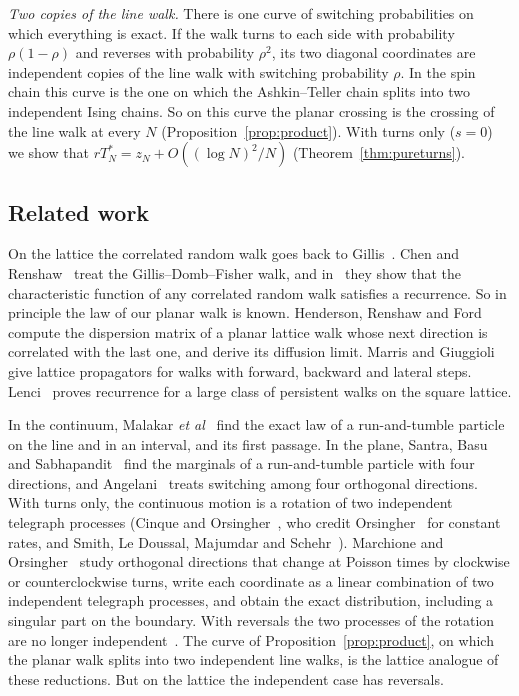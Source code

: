 \emph{Two copies of the line walk.} There is one curve of switching probabilities on which
everything is exact. If
the walk turns to each side with probability $\rho(1-\rho)$ and reverses with
probability $\rho^2$, its two diagonal coordinates are independent copies of
the line walk with switching probability $\rho$. In the spin chain this curve
is the one on which the Ashkin--Teller chain splits into two independent Ising
chains. So on this curve the planar
crossing is the crossing of the line walk at every $N$ (Proposition~\ref{prop:product}).
With turns only ($s=0$) we show that $rT^*_N=z_N+O((\log N)^2/N)$
(Theorem~\ref{thm:pureturns}).

\subsection{Related work}\label{sec:related}

On the lattice the correlated random walk goes back to
Gillis~\cite{gillis1955}. Chen and Renshaw~\cite{chenrenshaw1992} treat the
Gillis--Domb--Fisher walk, and in~\cite{chenrenshaw1994} they show that the
characteristic function of any correlated random walk satisfies a
recurrence. So in principle the law of our planar walk is known. Henderson,
Renshaw and Ford~\cite{hrf1984} compute the dispersion matrix of a planar
lattice walk whose next direction is correlated with the last one, and derive
its diffusion limit. Marris and
Giuggioli~\cite{marris2024} give lattice propagators for walks with forward,
backward and lateral steps. Lenci~\cite{lenci2007} proves recurrence for a
large class of persistent walks on the square lattice.

In the continuum, Malakar \emph{et al}~\cite{malakar2018} find the exact law of a
run-and-tumble particle on the line and in an interval, and its first passage. In the plane, Santra, Basu and
Sabhapandit~\cite{santra2020} find the marginals of a run-and-tumble particle
with four directions, and Angelani~\cite{angelani2022} treats switching among
four orthogonal directions. With turns only, the continuous motion is a
rotation of two independent telegraph processes (Cinque and
Orsingher~\cite[Theorem~2.2]{cinqueorsingher2023}, who credit
Orsingher~\cite{orsingher2000} for constant rates, and Smith, Le Doussal,
Majumdar and Schehr~\cite{sldms2022}). Marchione and
Orsingher~\cite{marchioneorsingher2024} study orthogonal directions that change
at Poisson times by clockwise or counterclockwise turns, write each coordinate
as a linear combination of two independent telegraph processes, and obtain the
exact distribution, including a singular part on the boundary. With reversals
the two processes of the rotation are no longer
independent~\cite[Section~3]{cinqueorsingher2023}. The curve of
Proposition~\ref{prop:product}, on which the planar walk splits into two
independent line walks, is the lattice analogue of these reductions. But on
the lattice the independent case has reversals.

